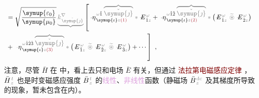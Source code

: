 \begin{subequations}
\begin{align}
	\\ &\hphantom{:}= \sqrt{\frac{\symup{\varepsilon_0}}{\symup{\mu_0}}} \mathcolor{gray}{\underbrace{k^\nabla_{\;\! \check{\symup{\jmath}}}}} \left[ \xint{\begin{smallmatrix} ~ \\ {}^{}_{\mathcolor{gray}{-}} \\ ~ \end{smallmatrix}}{17}{\eta}^{\;\! \mathcolor{gray}{\omega} \hat{1} \;\! \mathcolor{gray}{\overbrace{\check{\symup{\jmath}}}}}_{\;\! \symup{\iota} \mathcolor{gray}{z} \textcolor{Maroon}{(1)}} \mathcolor{gray}{*} \xint{\mathcolor{gray}{-}}{295}{E}^{\;\!\mathcolor{gray}{\omega}}_{\;\! \hat{1} \mathcolor{gray}{z}} + \xint{\begin{smallmatrix} ~ \\ {}^{}_{\mathcolor{gray}{-}} \\ ~ \end{smallmatrix}}{17}{\eta}^{\;\! \mathcolor{gray}{\omega} \hat{1} \hat{2} \;\! \mathcolor{gray}{\overbrace{\check{\symup{\jmath}}}}}_{\;\! \symup{\iota} \mathcolor{gray}{z} \textcolor{Maroon}{(2)}} \mathcolor{gray}{*} \left( \xint{\mathcolor{gray}{-}}{295}{E}^{\;\!\mathcolor{gray}{\omega}}_{\;\! \hat{1} \mathcolor{gray}{z}} ~\mathcolor{gray}{\widetilde \circledast}~ \xint{\mathcolor{gray}{-}}{295}{E}^{\;\!\mathcolor{gray}{\omega}}_{\;\! \hat{2} \mathcolor{gray}{z}} \right) \right. \label{eq:H_wknabla} \\ &\hphantom{:}+ \left. \xint{\begin{smallmatrix} ~ \\ {}^{}_{\mathcolor{gray}{-}} \\ ~ \end{smallmatrix}}{17}{\eta}^{\;\! \mathcolor{gray}{\omega} \hat{1} \hat{2} \hat{3} \;\! \mathcolor{gray}{\overbrace{\check{\symup{\jmath}}}}}_{\;\! \symup{\iota} \mathcolor{gray}{z} \textcolor{Maroon}{(3)}} \mathcolor{gray}{*} \left( \xint{\mathcolor{gray}{-}}{295}{E}^{\;\!\mathcolor{gray}{\omega}}_{\;\! \hat{1} \mathcolor{gray}{z}} ~\mathcolor{gray}{\widetilde \circledast}~ \xint{\mathcolor{gray}{-}}{295}{E}^{\;\!\mathcolor{gray}{\omega}}_{\;\! \hat{2} \mathcolor{gray}{z}} ~\mathcolor{gray}{\widetilde \circledast}~ \xint{\mathcolor{gray}{-}}{295}{E}^{\;\!\mathcolor{gray}{\omega}}_{\;\! \hat{3} \mathcolor{gray}{z}} \right) + \cdots \right]~,
\end{align}
\end{subequations}
注意，尽管 $\bar{H}$ 在  中，看上去只和电场 $\bar{E}$ 有关，但通过 \textcolor{Maroon}{法拉第电磁感应定律} ，$\bar{H}^{\;\!\mathcolor{gray}{t}}_{\;\! \mathcolor{gray}{z}}$ 也是时变磁感应强度 $\bar{B}^{\;\!\mathcolor{gray}{t}}_{\;\! \mathcolor{gray}{z}}$ 的\textcolor{Plum}{线性}、\textcolor{Plum}{非线性}函数（静磁场 $\bar{B}^{\;\!\mathcolor{gray}{\text{dc}}}_{\;\! \mathcolor{gray}{z}}$ 及其梯度所导致的现象，暂未包含在内）。

